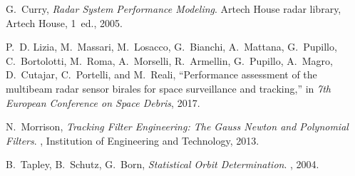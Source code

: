 \documentclass[conference]{IEEEtran}
\begin{document}
\begin{thebibliography}{99}
		G.~Curry, {\em Radar System Performance Modeling}.
		\newblock Artech House radar library, Artech House, 1~ed., 2005.
		
		P.~D. Lizia, M.~Massari, M.~Losacco, G.~Bianchi, A.~Mattana, G.~Pupillo,
		C.~Bortolotti, M.~Roma, A.~Morselli, R.~Armellin, G.~Pupillo, A.~Magro,
		D.~Cutajar, C.~Portelli, and M.~Reali, ``Performance assessment of the
		multibeam radar sensor birales for space surveillance and tracking,'' in {\em
			7th European Conference on Space Debris}, 2017.
		
		N.~Morrison, {\em {Tracking Filter Engineering: The Gauss Newton and Polynomial
				Filters}}.
		, {Institution of Engineering
			and Technology}, 2013.
		

		B.~Tapley, B.~Schutz, G.~Born, {\em {Statistical Orbit Determination}}.
		, 2004.





\end{thebibliography}
\end{document}
